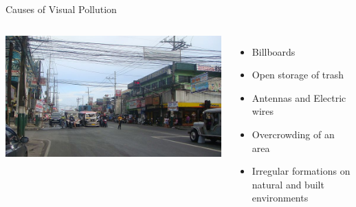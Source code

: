 \documentclass{beamer}
\begin{document}
     \begin{frame}{Causes of Visual Pollution}
        \begin{columns}
                \includegraphics[height=.99\textwidth,width=.99\textwidth]{img/wiki-1.JPG}
                \begin{itemize}
                    \item Billboards
                    \item Open storage of trash
                    \item Antennas and Electric wires
                    \item Overcrowding of an area
                    \item Irregular formations on natural and built environments
                \end{itemize}
        \end{columns}
     \end{frame}
\end{document}
